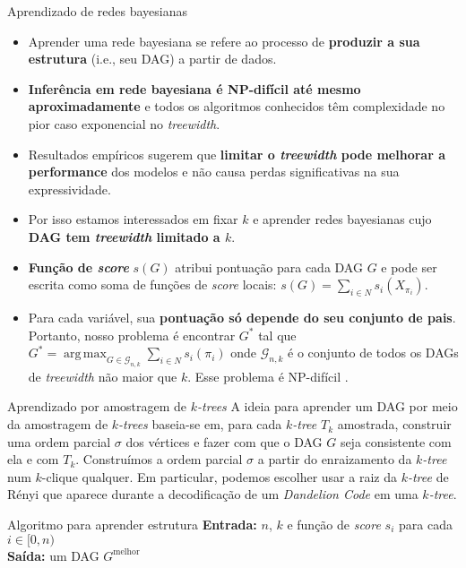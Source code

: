 \documentclass{beamer}
\DeclareMathOperator*{\argmax}{arg\,max}
\begin{document}
\begin{frame}
\begin{columns}[t]
\begin{column}{0.5\textwidth}
  \begin{block}{Aprendizado de redes bayesianas}
    \begin{itemize}
      \item Aprender uma rede bayesiana se refere ao processo de \textbf{produzir a sua estrutura} (i.e., seu DAG) a partir de dados.
      \item \textbf{Inferência em rede bayesiana é NP-difícil até mesmo aproximadamente} e todos os algoritmos conhecidos têm complexidade no pior caso exponencial no \emph{treewidth}.
      \item Resultados empíricos sugerem que \textbf{limitar o \emph{treewidth} pode melhorar a performance} dos modelos e não causa perdas significativas na sua expressividade.
      \item Por isso estamos interessados em fixar $k$ e aprender redes bayesianas cujo \textbf{DAG tem \emph{treewidth} limitado a $k$}.
      \item \textbf{Função de \emph{score}} $s(G)$ atribui pontuação para cada DAG $G$ e pode ser escrita como soma de funções de \emph{score} locais: $s(G) = \sum_{i \in N} s_i(X_{\pi_i})$.
      \item Para cada variável, sua \textbf{pontuação só depende do seu conjunto de pais}. Portanto, nosso problema é encontrar $G^*$ tal que $G^* = \argmax_{G \in \mathcal{G}_{n,k}} \sum_{i \in N} s_i(\pi_i)$ onde $\mathcal{G}_{n,k}$ é o conjunto de todos os DAGs de \emph{treewidth} não maior que $k$. Esse problema é NP-difícil \cite{korhonen}.
    \end{itemize}
  \end{block}

  \begin{block}{Aprendizado por amostragem de \emph{$k$-trees}}
    A ideia para aprender um DAG por meio da amostragem de \emph{$k$-trees} baseia-se em, para cada \emph{$k$-tree} $T_k$ amostrada, construir uma ordem parcial $\sigma$ dos vértices e fazer com que o DAG $G$ seja consistente com ela e com $T_k$. Construímos a ordem parcial $\sigma$ a partir do enraizamento da \emph{$k$-tree} num $k$-clique qualquer. Em particular, podemos escolher usar a raiz da \emph{$k$-tree} de Rényi que aparece durante a decodificação de um \emph{Dandelion Code} em uma \emph{$k$-tree}.
  \end{block}

  \begin{block}{Algoritmo para aprender estrutura}
    \textbf{Entrada:} $n$, $k$ e função de \emph{score} $s_i$ para cada $i \in [0, n)$\\
    \textbf{Saída:} um DAG $G^{\text{melhor}}$


\end{block}
\end{column}
\end{columns}
\end{frame}
\end{document}
